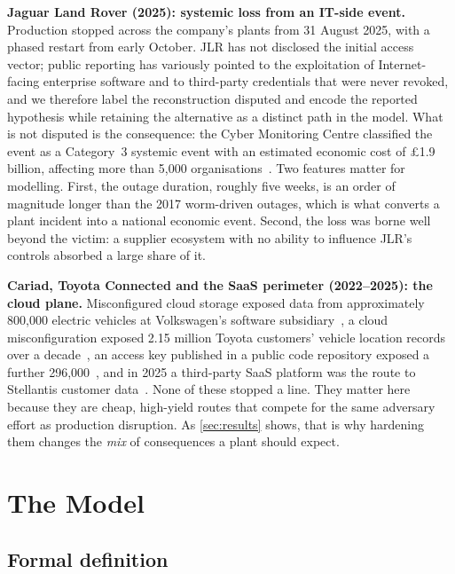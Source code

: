 \textbf{Jaguar Land Rover (2025): systemic loss from an IT-side event.}
Production stopped across the company's plants from 31 August 2025, with a
phased restart from early October. JLR has not disclosed the initial access
vector; public reporting has variously pointed to the exploitation of
Internet-facing enterprise software and to third-party credentials that were
never revoked, and we therefore label the reconstruction \textsf{disputed} and
encode the reported hypothesis while retaining the alternative as a distinct
path in the model. What is not disputed is the consequence: the Cyber
Monitoring Centre classified the event as a Category~3 systemic event with an
estimated economic cost of \pounds1.9 billion, affecting more than 5,000
organisations~\cite{inc18cmc,inc18cw}. Two features matter for modelling.
First, the outage duration, roughly five weeks, is an order of magnitude longer than the 2017 worm-driven outages, which is what converts a plant
incident into a national economic event. Second, the loss was borne well
beyond the victim: a supplier ecosystem with no ability to influence JLR's
controls absorbed a large share of it.

\textbf{Cariad, Toyota Connected and the SaaS perimeter (2022--2025): the
cloud plane.} Misconfigured cloud storage exposed data from approximately
800,000 electric vehicles at Volkswagen's software subsidiary~\cite{inc10vw},
a cloud misconfiguration exposed 2.15 million Toyota customers' vehicle
location records over a decade~\cite{inc09toyotacloud}, an access key published
in a public code repository exposed a further
296,000~\cite{inc19toyotagithub}, and in 2025 a third-party SaaS platform was
the route to Stellantis customer data~\cite{inc17stellantis}. None of these
stopped a line. They matter here because they are cheap, high-yield routes that
compete for the same adversary effort as production disruption. As
\cref{sec:results} shows, that is why hardening them changes the \emph{mix} of
consequences a plant should expect.

\section{The \capm{} Model}
\label{sec:model}

\subsection{Formal definition}

